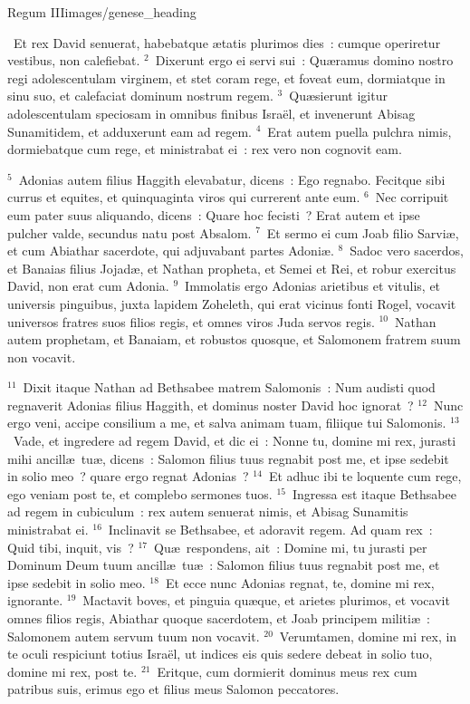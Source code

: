 {Regum III}{images/genese_heading}

~\lettrine[lines=10,image=true,loversize=0.05,lraise=-0.03]{E}{}t rex David senuerat, habebatque \ae tatis plurimos dies~: cumque operiretur vestibus, non calefiebat.
${}^{2}$~Dixerunt ergo ei servi sui~: Qu\ae ramus domino nostro regi adolescentulam virginem, et stet coram rege, et foveat eum, dormiatque in sinu suo, et calefaciat dominum nostrum regem.
${}^{3}$~Qu\ae sierunt igitur adolescentulam speciosam in omnibus finibus Isra\"el, et invenerunt Abisag Sunamitidem, et adduxerunt eam ad regem.
${}^{4}$~Erat autem puella pulchra nimis, dormiebatque cum rege, et ministrabat ei~: rex vero non cognovit eam.


${}^{5}$~Adonias autem filius Haggith elevabatur, dicens~: Ego regnabo. Fecitque sibi currus et equites, et quinquaginta viros qui currerent ante eum.
${}^{6}$~Nec corripuit eum pater suus aliquando, dicens~: Quare hoc fecisti~? Erat autem et ipse pulcher valde, secundus natu post Absalom.
${}^{7}$~Et sermo ei cum Joab filio Sarvi\ae , et cum Abiathar sacerdote, qui adjuvabant partes Adoni\ae .
${}^{8}$~Sadoc vero sacerdos, et Banaias filius Jojad\ae , et Nathan propheta, et Semei et Rei, et robur exercitus David, non erat cum Adonia.
${}^{9}$~Immolatis ergo Adonias arietibus et vitulis, et universis pinguibus, juxta lapidem Zoheleth, qui erat vicinus fonti Rogel, vocavit universos fratres suos filios regis, et omnes viros Juda servos regis.
${}^{10}$~Nathan autem prophetam, et Banaiam, et robustos quosque, et Salomonem fratrem suum non vocavit.


${}^{11}$~Dixit itaque Nathan ad Bethsabee matrem Salomonis~: Num audisti quod regnaverit Adonias filius Haggith, et dominus noster David hoc ignorat~?
${}^{12}$~Nunc ergo veni, accipe consilium a me, et salva animam tuam, filiique tui Salomonis.
${}^{13}$~Vade, et ingredere ad regem David, et dic ei~: Nonne tu, domine mi rex, jurasti mihi ancill\ae\ tu\ae , dicens~: Salomon filius tuus regnabit post me, et ipse sedebit in solio meo~? quare ergo regnat Adonias~?
${}^{14}$~Et adhuc ibi te loquente cum rege, ego veniam post te, et complebo sermones tuos.
${}^{15}$~Ingressa est itaque Bethsabee ad regem in cubiculum~: rex autem senuerat nimis, et Abisag Sunamitis ministrabat ei.
${}^{16}$~Inclinavit se Bethsabee, et adoravit regem. Ad quam rex~: Quid tibi, inquit, vis~?
${}^{17}$~Qu\ae\ respondens, ait~: Domine mi, tu jurasti per Dominum Deum tuum ancill\ae\ tu\ae~: Salomon filius tuus regnabit post me, et ipse sedebit in solio meo.
${}^{18}$~Et ecce nunc Adonias regnat, te, domine mi rex, ignorante.
${}^{19}$~Mactavit boves, et pinguia qu\ae que, et arietes plurimos, et vocavit omnes filios regis, Abiathar quoque sacerdotem, et Joab principem militi\ae~: Salomonem autem servum tuum non vocavit.
${}^{20}$~Verumtamen, domine mi rex, in te oculi respiciunt totius Isra\"el, ut indices eis quis sedere debeat in solio tuo, domine mi rex, post te.
${}^{21}$~Eritque, cum dormierit dominus meus rex cum patribus suis, erimus ego et filius meus Salomon peccatores.


